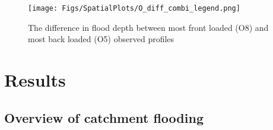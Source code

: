 \documentclass[APA,Times2COL]{WileyNJDv5}
\begin{document}


\begin{figure}[h!]
    \centering
 \texttt{[image: Figs/SpatialPlots/O\_diff\_combi\_legend.png]}    
 \vspace{-25pt}
   \caption{The difference in flood depth between most front loaded (O8) and most back loaded (O5) observed profiles}\label{fig:flooded_area_spatial_diff} 
\end{figure}

\section{Results}\label{sec:results}

\subsection{Overview of catchment flooding}\label{subsec:overview}
\end{document}

